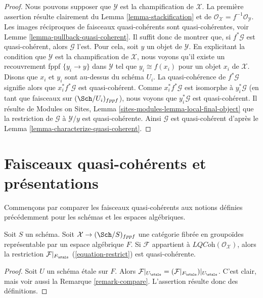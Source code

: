 \begin{proof}
Nous pouvons supposer que $\mathcal{Y}$ est la champification de $\mathcal{X}$.
La première assertion résulte clairement du
Lemma \ref{lemma-stackification}
et de
$\mathcal{O}_\mathcal{X} = f^{-1}\mathcal{O}_\mathcal{Y}$.
Les images réciproques de faisceaux quasi-cohérents sont quasi-cohérentes, voir
Lemme \ref{lemma-pullback-quasi-coherent}.
Il suffit donc de montrer que, si $f^*\mathcal{G}$ est
quasi-cohérent, alors $\mathcal{G}$ l'est.
Pour cela, soit $y$ un objet de $\mathcal{Y}$.
En explicitant la condition que $\mathcal{Y}$ est la champification
de $\mathcal{X}$, nous voyons qu'il existe un recouvrement fppf $\{y_i \to y\}$
dans $\mathcal{Y}$ tel que $y_i \cong f(x_i)$ pour un
objet $x_i$ de $\mathcal{X}$. Disons que $x_i$ et $y_i$ sont au-dessus du schéma $U_i$.
La quasi-cohérence de $f^*\mathcal{G}$ signifie alors que $x_i^*f^*\mathcal{G}$
est quasi-cohérent. Comme $x_i^*f^*\mathcal{G}$ est isomorphe à
$y_i^*\mathcal{G}$ (en tant que faisceaux sur $(\Sch/U_i)_{fppf}$), nous
voyons que $y_i^*\mathcal{G}$ est quasi-cohérent.
Il résulte de
Modules on Sites, Lemma \ref{sites-modules-lemma-local-final-object}
que la restriction de $\mathcal{G}$ à $\mathcal{Y}/y$ est
quasi-cohérente. Ainsi $\mathcal{G}$ est quasi-cohérent d'après le
Lemma \ref{lemma-characterize-quasi-coherent}.
\end{proof}





\section{Faisceaux quasi-cohérents et présentations}
\label{section-quasi-coherent-presentation}

\noindent
Commençons par comparer les faisceaux quasi-cohérents aux notions définies
précédemment pour les schémas et les espaces algébriques.

\begin{lemma}
\label{lemma-compare-locally-quasi-coherent}
Soit $S$ un schéma. Soit $\mathcal{X} \to (\Sch/S)_{fppf}$ une catégorie
fibrée en groupoïdes représentable par un espace algébrique $F$.
Si $\mathcal{F}$ appartient à $\textit{LQCoh}(\mathcal{O}_\mathcal{X})$,
alors la restriction $\mathcal{F}|_{F_\etale}$ (\ref{equation-restrict})
est quasi-cohérente.
\end{lemma}

\begin{proof}
Soit $U$ un schéma étale sur $F$. Alors
$\mathcal{F}|_{U_\etale} = (\mathcal{F}|_{F_\etale})|_{U_\etale}$.
C'est clair, mais voir aussi la Remarque \ref{remark-compare}.
L'assertion résulte donc des définitions.
\end{proof}

